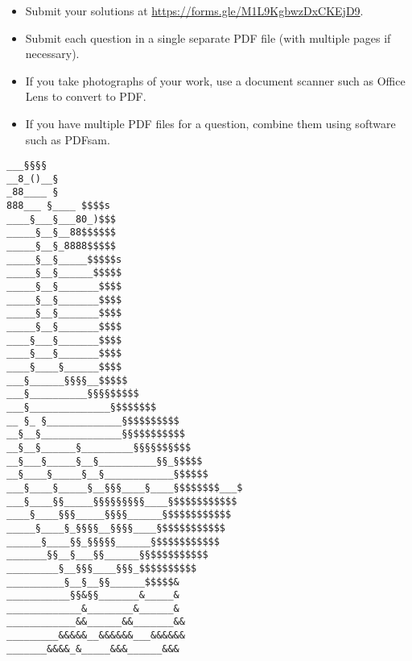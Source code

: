 \documentclass{article}
\begin{document}
\vfill
\begin{itemize}
	\item Submit your solutions at \url{https://forms.gle/M1L9KgbwzDxCKEjD9}.
	\item Submit each question in a single separate PDF file (with multiple pages if necessary).
	\item If you take photographs of your work, use a document scanner such as Office Lens to convert to PDF.
	\item If you have multiple PDF files for a question, combine them using software such as PDFsam.
\end{itemize}

\vfill
\centering
\tiny
\begin{BVerbatim}
___§§§§
__8_()__§
_88____ §
888___ §____ $$$$s
____§___§___80_)$$$
_____§__§__88$$$$$$
_____§__§_8888$$$$$
_____§__§_____$$$$$s
_____§__§______$$$$$
_____§__§_______$$$$
_____§__§_______$$$$
_____§__§_______$$$$
_____§__§_______$$$$
____§___§_______$$$$
____§___§_______$$$$
____§____§______$$$$
___§______§§§§__$$$$$
___§__________§§§§$$$$$
___§______________§$$$$$$$
__ §_ §_____________§$$$$$$$$$
__§__§______________§§$$$$$$$$$
__§__§______§_________§§§§$$§$$$
__§___§_____§__§__________§§_§$$$$
__§____§_____§__§____________§$$$$$
___§____§_____§__§§§____§____§$$$$$$$___$
___§____§§_____§§§§§§§§§____§$$$$$$$$$$$
____§____§§§_____§§§§______§$$$$$$$$$$$
_____§____§_§§§§__§§§§____§$$$$$$$$$$$
______§____§§_§§§§§______§$$$$$$$$$$$
_______§§__§___§§______§§$$$$$$$$$$
_________§__§§§____§§§_$$$$$$$$$$
__________§__§__§§______$$$$$&
___________§§&§§_______&_____&
_____________&________&______&
____________&&______&&_______&&
_________&&&&&__&&&&&&___&&&&&&
_______&&&&_&_____&&&______&&&
\end{BVerbatim}
\end{document}
